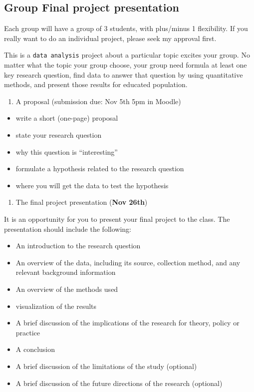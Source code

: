 \documentclass[
  letterpaper,
  DIV=11,
  numbers=noendperiod]{scrartcl}
\providecommand{\tightlist}{%
  \setlength{\itemsep}{0pt}\setlength{\parskip}{0pt}}
\begin{document}
\subsection{Group Final project
presentation}\label{group-final-project-presentation}

Each group will have a group of 3 students, with plus/minus 1
flexibility. If you really want to do an individual project, please seek
my approval first.

This is a \texttt{data\ analysis} project about a particular topic
excites your group. No matter what the topic your group choose, your
group need formula at least one key research question, find data to
answer that question by using quantitative methods, and present those
results for educated population.

\begin{enumerate}
\def\labelenumi{\arabic{enumi}.}
\tightlist
\item
  A proposal (submission due: Nov 5th 5pm in Moodle)
\end{enumerate}

\begin{itemize}
\tightlist
\item
  write a short (one-page) proposal
\item
  state your research question
\item
  why this question is ``interesting''
\item
  formulate a hypothesis related to the research question
\item
  where you will get the data to test the hypothesis
\end{itemize}

\begin{enumerate}
\def\labelenumi{\arabic{enumi}.}
\setcounter{enumi}{1}
\tightlist
\item
  The final project presentation (\textbf{Nov 26th})
\end{enumerate}

It is an opportunity for you to present your final project to the class.
The presentation should include the following:

\begin{itemize}
\tightlist
\item
  An introduction to the research question
\item
  An overview of the data, including its source, collection method, and
  any relevant background information
\item
  An overview of the methods used
\item
  visualization of the results
\item
  A brief discussion of the implications of the research for theory,
  policy or practice
\item
  A conclusion
\item
  A brief discussion of the limitations of the study (optional)
\item
  A brief discussion of the future directions of the research (optional)
\end{itemize}
\end{document}

